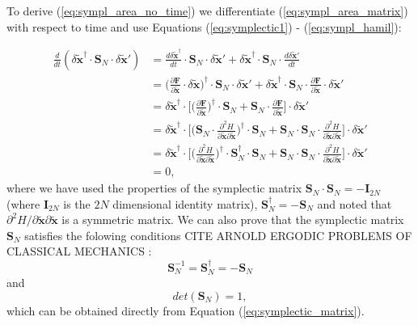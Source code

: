 To derive (\ref{eq:sympl_area_no_time}) we differentiate (\ref{eq:sympl_area_matrix}) with respect to time and use Equations (\ref{eq:symplectic1}) - (\ref{eq:sympl_hamil}):

\begin{align}
\frac{d}{dt}(\delta \tilde{\bm{x}}^{\dagger}\cdot \bm{S}_N\cdot \delta \tilde{\bm{x}}')
&= \frac{d\delta \tilde{\bm{x}}^{\dagger}}{dt}\cdot \bm{S}_N\cdot \delta \tilde{\bm{x}}'+\delta \tilde{\bm{x}}^{\dagger}\cdot \bm{S}_N\cdot \frac{d\delta \tilde{\bm{x}}'}{dt}
\nonumber \\
&= \bigg(\frac{\partial \bm{F}}{\partial \tilde{\bm{x}}}\cdot \delta \tilde{\bm{x}}\bigg)^{\dagger}\cdot \bm{S}_N\cdot \delta \tilde{\bm{x}}'+\delta \tilde{\bm{x}}^{\dagger}\cdot \bm{S}_N \cdot \frac{\partial \bm{F}}{\partial \tilde{\bm{x}}}\cdot \delta \tilde{\bm{x}}'
 \nonumber \\
&= \delta \tilde{\bm{x}}^{\dagger}\cdot \Bigg[\bigg(\frac{\partial \bm{F}}{\partial \tilde{\bm{x}}}\bigg)^{\dagger}\cdot\bm{S}_N+\bm{S}_N\cdot \frac{\partial \bm{F}}{\partial \tilde{\bm{x}}}\Bigg]\cdot \delta\tilde{\bm{x}}'
\nonumber \\
&= \delta\tilde{\bm{x}}^{\dagger}\cdot\Bigg[\bigg(\bm{S}_N\cdot\frac{\partial^2 H}{\partial \tilde{\bm{x}} \partial \tilde{\bm{x}}}\bigg)^{\dagger}\cdot \bm{S}_N+\bm{S}_N\cdot\bm{S}_N\cdot\frac{\partial^2 H}{\partial\tilde{\bm{x}}\partial\tilde{\bm{x}}}\Bigg]\cdot\delta\tilde{\bm{x}}' \nonumber \\
&= \delta\tilde{\bm{x}}^{\dagger}\cdot\Bigg[\bigg(\frac{\partial^2 H}{\partial \tilde{\bm{x}} \partial \tilde{\bm{x}}}\bigg)^{\dagger}\cdot\bm{S}_N^{\dagger}\cdot \bm{S}_N+\bm{S}_N\cdot\bm{S}_N\cdot\frac{\partial^2 H}{\partial\tilde{\bm{x}}\partial\tilde{\bm{x}}}\Bigg]\cdot\delta\tilde{\bm{x}}' \nonumber \\
&=0,
\label{eq:proff_sympl_area}
\end{align} 
where we have used the properties of the symplectic matrix $\bm{S}_N\cdot\bm{S}_N=-\bm{I}_{2N}$ (where $\bm{I}_{2N}$ is the $2N$ dimensional identity matrix), $\bm{S}_N^{\dagger}=-\bm{S}_N$ and noted that $\partial^2H/\partial\tilde{\bm{x}}\partial\tilde{\bm{x}}$ is a symmetric matrix. We can also prove that the symplectic matrix $\bm{S}_N$ satisfies the folowing conditions CITE ARNOLD ERGODIC PROBLEMS OF CLASSICAL MECHANICS :
\begin{equation}
\bm{S}_N^{-1}=\bm{S}_N^{\dagger}=-\bm{S}_N
\end{equation}
and
\begin{equation}
det(\bm{S}_N)=1,
\end{equation}
which can be obtained directly from Equation (\ref{eq:symplectic_matrix}).\par

